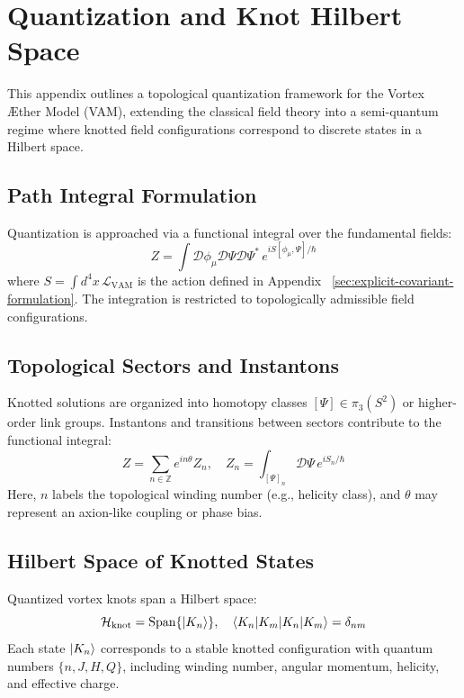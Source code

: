 \documentclass[a4paper,12pt]{article}
\begin{document}
    \section{Quantization and Knot Hilbert Space}
    This appendix outlines a topological quantization framework for the Vortex Æther Model (VAM), extending the classical field theory into a semi-quantum regime where knotted field configurations correspond to discrete states in a Hilbert space.

    \subsection{Path Integral Formulation}
    Quantization is approached via a functional integral over the fundamental fields:
    \begin{equation}
        Z = \int \mathcal{D}\phi_\mu \mathcal{D}\Psi \mathcal{D}\Psi^* \, e^{i S[\phi_\mu, \Psi] / \hbar}
    \end{equation}
    where $S = \int d^4x \, \mathcal{L}_{\text{VAM}}$ is the action defined in Appendix ~\ref{sec:explicit-covariant-formulation}. The integration is restricted to topologically admissible field configurations.

    \subsection{Topological Sectors and Instantons}
    Knotted solutions are organized into homotopy classes $[\Psi] \in \pi_3(S^2)$ or higher-order link groups. Instantons and transitions between sectors contribute to the functional integral:
    \begin{equation}
        Z = \sum_{n \in \mathbb{Z}} e^{i n \theta} Z_n, \quad Z_n = \int_{[\Psi]_n} \mathcal{D} \Psi \, e^{i S_n / \hbar}
    \end{equation}
    Here, $n$ labels the topological winding number (e.g., helicity class), and $\theta$ may represent an axion-like coupling or phase bias.

    \subsection{Hilbert Space of Knotted States}
    Quantized vortex knots span a Hilbert space:
    \begin{equation}
        \mathcal{H}_{\text{knot}} = \text{Span} \{ \ket{K_n} \}, \quad \braket{K_n | K_m} = \delta_{nm}
    \end{equation}
    Each state $\ket{K_n}$ corresponds to a stable knotted configuration with quantum numbers $\{ n, J, H, Q \}$, including winding number, angular momentum, helicity, and effective charge.
\end{document}

